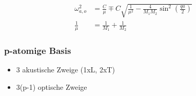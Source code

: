 \begin{equation*}
    \begin{aligned}
        \omega_{a,o}^2 &= \frac{C}{\mu} \mp C \sqrt{\frac{1}{\mu^2}- \frac{4}{M_1M_2} \sin^2\left(\frac{qa}{2}\right)} \\
        \frac{1}{\mu} &= \frac{1}{M_1} + \frac{1}{M_2}
    \end{aligned}
\end{equation*}

\subsubsection*{p-atomige Basis}

\begin{itemize}
    \itemsep 0pt
    \item 3 akustische Zweige (1xL, 2xT)
    \item 3(p-1) optische Zweige
\end{itemize}

